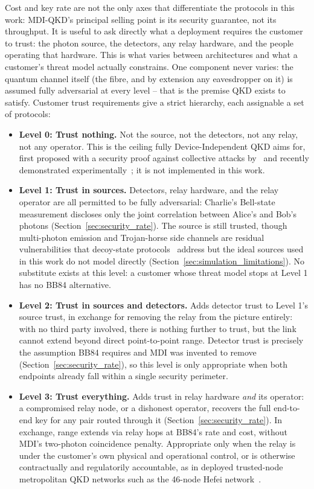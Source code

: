 \documentclass[12pt]{article}
\begin{document}
Cost and key rate are not the only axes that differentiate the protocols in this work: MDI-QKD's principal selling point is its security guarantee, not its throughput. It is useful to ask directly what a deployment requires the customer to trust: the photon source, the detectors, any relay hardware, and the people operating that hardware. This is what varies between architectures and what a customer's threat model actually constrains. One component never varies: the quantum channel itself (the fibre, and by extension any eavesdropper on it) is assumed fully adversarial at every level -- that is the premise QKD exists to satisfy. Customer trust requirements give a strict hierarchy, each assignable a set of protocols:

\begin{itemize}
    \item \textbf{Level 0: Trust nothing.} Not the source, not the detectors, not any relay, not any operator. This is the ceiling fully Device-Independent QKD aims for, first proposed with a security proof against collective attacks by~\cite{Acin_2007} and recently demonstrated experimentally~\cite{Lu2026}; it is not implemented in this work.
    \item \textbf{Level 1: Trust in sources.} Detectors, relay hardware, and the relay operator are all permitted to be fully adversarial: Charlie's Bell-state measurement discloses only the joint correlation between Alice's and Bob's photons (Section~\ref{sec:security_rate}). The source is still trusted, though multi-photon emission and Trojan-horse side channels are residual vulnerabilities that decoy-state protocols~\cite{Lo_2012,Lo_decoys} address but the ideal sources used in this work do not model directly (Section~\ref{sec:simulation_limitations}). No substitute exists at this level: a customer whose threat model stops at Level 1 has no BB84 alternative.
    \item \textbf{Level 2: Trust in sources and detectors.} Adds detector trust to Level 1's source trust, in exchange for removing the relay from the picture entirely: with no third party involved, there is nothing further to trust, but the link cannot extend beyond direct point-to-point range. Detector trust is precisely the assumption BB84 requires and MDI was invented to remove (Section~\ref{sec:security_rate}), so this level is only appropriate when both endpoints already fall within a single security perimeter.
    \item \textbf{Level 3: Trust everything.} Adds trust in relay hardware \emph{and} its operator: a compromised relay node, or a dishonest operator, recovers the full end-to-end key for any pair routed through it (Section~\ref{sec:security_rate}). In exchange, range extends via relay hops at BB84's rate and cost, without MDI's two-photon coincidence penalty. Appropriate only when the relay is under the customer's own physical and operational control, or is otherwise contractually and regulatorily accountable, as in deployed trusted-node metropolitan QKD networks such as the 46-node Hefei network~\cite{Chen_2021_46node}.
\end{itemize}
\end{document}
